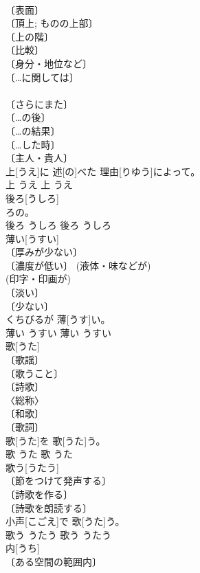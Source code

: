 \documentclass[8pt]{extreport}
\begin{document}
\begin{CJK}{UTF8}{min}
\\	〔表面〕 
\\	〔頂上; ものの上部〕 
\\	〔上の階〕 
\\	〔比較〕 
\\	〔身分・地位など〕 
\\	〔…に関しては〕 
\\	[＝-じょう１] 
\\	〔さらにまた〕 
\\	〔…の後〕 
\\	〔…の結果〕 
\\	〔…した時〕 
\\	〔主人・貴人〕 
\\	上[うえ]に 述[の]べた 理由[りゆう]によって。	
\\	上	うえ	上	うえ	
\\	後ろ[うしろ]	
\\	[＝あと１ 
\\	後[うし]ろの。	
\\	後ろ	うしろ	後ろ	うしろ	
\\	薄い[うすい]	
\\	〔厚みが少ない〕 
\\	〔濃度が低い〕 (液体・味などが) 
\\	(印字・印画が) 
\\	〔淡い〕 
\\	〔少ない〕 
\\	くちびるが 薄[うす]い。	
\\	薄い	うすい	薄い	うすい	
\\	歌[うた]	
\\	〔歌謡〕 
\\	〔歌うこと〕 
\\	〔詩歌〕 
\\	〈総称〉 
\\	〔和歌〕 
\\	〔歌詞〕 
\\	歌[うた]を 歌[うた]う。	
\\	歌	うた	歌	うた	
\\	歌う[うたう]	
\\	〔節をつけて発声する〕 
\\	〔詩歌を作る〕 
\\	〔詩歌を朗読する〕 
\\	小声[こごえ]で 歌[うた]う。	
\\	歌う	うたう	歌う	うたう	
\\	内[うち]	
\\	〔ある空間の範囲内〕 
\\	[⇒うちがわ, なか１] 

\end{CJK}
\end{document}
